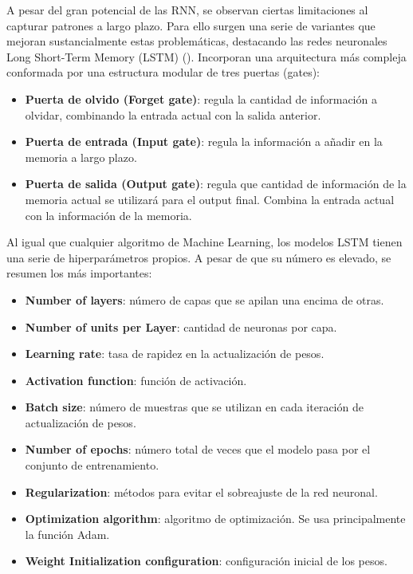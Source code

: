 \documentclass[12pt,a4paper]{report}
\begin{document}
A pesar del gran potencial de las RNN, se observan ciertas limitaciones al capturar patrones a largo plazo. Para ello surgen una serie de variantes que mejoran sustancialmente estas problemáticas, destacando las redes neuronales Long Short-Term Memory (LSTM) (\cite{skforecast}). Incorporan una arquitectura más compleja conformada por una estructura modular de tres puertas (gates):

\begin{itemize}
    \item \textbf{Puerta de olvido (Forget gate)}: regula la cantidad de información a olvidar, combinando la entrada actual con la salida anterior.

    \item \textbf{Puerta de entrada (Input gate)}: regula la información a añadir en la memoria a largo plazo.

    \item \textbf{Puerta de salida (Output gate)}: regula que cantidad de información de la memoria actual se utilizará para el output final. Combina la entrada actual con la información de la memoria.
\end{itemize}

Al igual que cualquier algoritmo de Machine Learning, los modelos LSTM tienen una serie de hiperparámetros propios. A pesar de que su número es elevado, se resumen los más importantes:

\begin{itemize}
    \item \textbf{Number of layers}: número de capas que se apilan una encima de otras.

    \item \textbf{Number of units per Layer}: cantidad de neuronas por capa.

    \item \textbf{Learning rate}: tasa de rapidez en la actualización de pesos.

    \item \textbf{Activation function}: función de activación.

    \item \textbf{Batch size}: número de muestras que se utilizan en cada iteración de actualización de pesos.

    \item \textbf{Number of epochs}: número total de veces que el modelo pasa por el conjunto de entrenamiento.

    \item \textbf{Regularization}: métodos para evitar el sobreajuste de la red neuronal.

    \item \textbf{Optimization algorithm}: algoritmo de optimización. Se usa principalmente la función Adam.

    \item \textbf{Weight Initialization configuration}: configuración inicial de los pesos.
\end{itemize}
\end{document}
